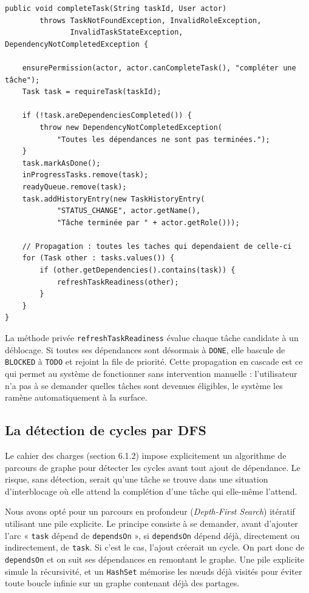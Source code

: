 \documentclass[11pt]{article}
\begin{document}
\begin{lstlisting}[caption={Clôture d'une tâche avec propagation}]
public void completeTask(String taskId, User actor)
        throws TaskNotFoundException, InvalidRoleException,
               InvalidTaskStateException, DependencyNotCompletedException {

    ensurePermission(actor, actor.canCompleteTask(), "compléter une tâche");
    Task task = requireTask(taskId);

    if (!task.areDependenciesCompleted()) {
        throw new DependencyNotCompletedException(
            "Toutes les dépendances ne sont pas terminées.");
    }
    task.markAsDone();
    inProgressTasks.remove(task);
    readyQueue.remove(task);
    task.addHistoryEntry(new TaskHistoryEntry(
            "STATUS_CHANGE", actor.getName(),
            "Tâche terminée par " + actor.getRole()));

    // Propagation : toutes les taches qui dependaient de celle-ci
    for (Task other : tasks.values()) {
        if (other.getDependencies().contains(task)) {
            refreshTaskReadiness(other);
        }
    }
}
\end{lstlisting}

La méthode privée \texttt{refreshTaskReadiness} évalue chaque tâche
candidate à un déblocage. Si toutes ses dépendances sont désormais à
\texttt{DONE}, elle bascule de \texttt{BLOCKED} à \texttt{TODO} et
rejoint la file de priorité. Cette propagation en cascade est ce qui
permet au système de fonctionner sans intervention manuelle : l'utilisateur
n'a pas à se demander quelles tâches sont devenues éligibles, le système
les ramène automatiquement à la surface.

\subsection{La détection de cycles par DFS}
Le cahier des charges (section 6.1.2) impose explicitement un algorithme
de parcours de graphe pour détecter les cycles avant tout ajout de
dépendance. Le risque, sans détection, serait qu'une tâche se trouve
dans une situation d'interblocage où elle attend la complétion d'une
tâche qui elle-même l'attend.

Nous avons opté pour un parcours en profondeur (\textit{Depth-First
Search}) itératif utilisant une pile explicite. Le principe consiste à
se demander, avant d'ajouter l'arc « \texttt{task} dépend de
\texttt{dependsOn} », si \texttt{dependsOn} dépend déjà, directement ou
indirectement, de \texttt{task}. Si c'est le cas, l'ajout créerait un
cycle. On part donc de \texttt{dependsOn} et on suit ses dépendances en
remontant le graphe. Une pile explicite simule la récursivité, et un
\texttt{HashSet} mémorise les n\oe uds déjà visités pour éviter toute
boucle infinie sur un graphe contenant déjà des partages.
\end{document}
